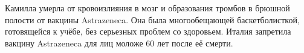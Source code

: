 Камилла умерла от кровоизлияния в мозг и образования тромбов в брюшной полости
от вакцины Astrazeneca. Она была многообещающей баскетболисткой, готовящейся к
учёбе, без серьезных проблем со здоровьем.  Италия запретила вакцину Astrazeneca
для лиц моложе 60 лет после её смерти.
